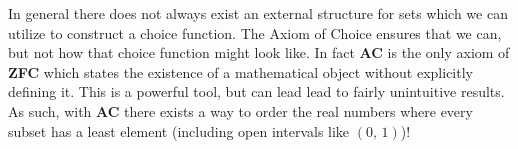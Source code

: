 \documentclass[../../main.tex]{subfiles}
\begin{document}
In general there does not always exist an external structure for sets which we can utilize to construct a choice function.
The Axiom of Choice ensures that we can, but not how that choice function might look like.
In fact \textbf{AC} is the only axiom of \textbf{ZFC} which states the existence of a mathematical object without explicitly defining it.
This is a powerful tool, but can lead lead to fairly unintuitive results. 
As such, with \textbf{AC} there exists a way to order the real numbers where every subset has a least element (including open intervals like $\left(0,\, 1\right)$)!
\end{document}
